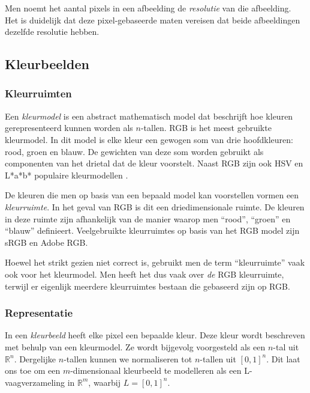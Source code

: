 Men noemt het aantal pixels in een afbeelding de \emph{resolutie} van die afbeelding. Het is
duidelijk dat deze pixel-gebaseerde maten vereisen dat beide afbeeldingen dezelfde resolutie 
hebben.


\subsection{Kleurbeelden}

\subsubsection{Kleurruimten}

Een \emph{kleurmodel} is een abstract mathematisch model dat beschrijft hoe kleuren gerepresenteerd 
kunnen worden als $n$-tallen. RGB is het meest gebruikte kleurmodel. In dit model is elke kleur
een gewogen som van drie hoofdkleuren: rood, groen en blauw. De gewichten van deze som
worden gebruikt als componenten van het drietal dat de kleur voorstelt. Naast RGB zijn ook
HSV en L*a*b* populaire kleurmodellen \cite{phillips:beeldverwerking}.

De kleuren die men op basis van een bepaald model kan voorstellen vormen een \emph{kleurruimte}. 
In het geval van RGB is dit een driedimensionale ruimte. De kleuren in deze ruimte zijn afhankelijk
van de manier waarop men ``rood'', ``groen'' en ``blauw'' definieert. Veelgebruikte kleurruimtes 
op basis van het RGB model zijn sRGB en Adobe RGB.

Hoewel het strikt gezien niet correct is, gebruikt men de term ``kleurruimte'' vaak ook voor het
kleurmodel. Men heeft het dus vaak over \emph{de} RGB kleurruimte, terwijl er eigenlijk meerdere
kleurruimtes bestaan die gebaseerd zijn op RGB. 

\subsubsection{Representatie}

In een \emph{kleurbeeld} heeft elke pixel een bepaalde kleur. Deze kleur wordt beschreven met
behulp van een kleurmodel. Ze wordt bijgevolg voorgesteld als een $n$-tal uit
$\mathbb{R}^n$. Dergelijke $n$-tallen kunnen we normaliseren tot $n$-tallen uit $[0,1]^n$. 
Dit laat ons toe om een $m$-dimensionaal kleurbeeld te modelleren als een L-vaagverzameling in 
$\mathbb{R}^m$, waarbij $L=[0,1]^n$.

